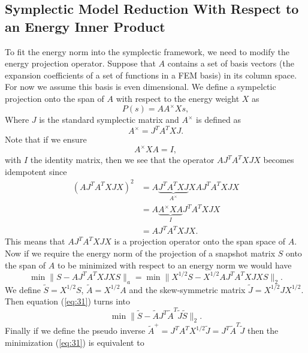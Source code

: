\documentclass[12pt]{article}
\begin{document}
\subsection{Symplectic Model Reduction With Respect to an Energy Inner Product}
To fit the energy norm into the symplectic framework, we need to modify the energy projection operator. Suppose that $A$ contains a set of basis vectors (the expansion coefficients of a set of functions in a FEM basis) in its column space. For now we assume this basis is even dimensional. We define a sympelctic projection onto the span of $A$ with respect to the energy weight $X$ as
\begin{equation} \label{eq:28}
	P(s) = AA^\times Xs,
\end{equation}
Where $J$ is the standard symplectic matrix and $A^\times$ is defined as
\begin{equation} \label{eq:29}
	A^\times = J^T A^T X J.
\end{equation}
Note that if we ensure
\begin{equation} \label{eq:30}
	A^\times XA=I,
\end{equation}
with $I$ the identity matrix, then we see that the operator $AJ^TA^TXJX$ becomes idempotent since
\begin{equation} \label{eq:31}
\begin{aligned}
	(AJ^TA^TXJX)^2 &= A\underbrace{J^TA^TXJ}_{A^\times}XAJ^TA^TXJX \\
	&= A\underbrace{A^\times XA}_{I}J^TA^TXJX\\
       	&= AJ^TA^TXJX.
\end{aligned}
\end{equation}
This means that $AJ^TA^TXJX$ is a projection operator onto the span space of $A$. Now if we require the energy norm of the projection of a snapshot matrix $S$ onto the span of $A$ to be minimized with respect to an energy norm we would have
\begin{equation} \label{eq:32}
	\min \| S - AJ^TA^TXJX S \|_a = \min \| X^{1/2} S - X^{1/2} AJ^TA^TXJX S \|_2.
\end{equation}
We define $\tilde S = X^{1/2}S$, $\tilde A = X^{1/2} A$ and the skew-symmetric matrix $\tilde J = X^{1/2} J X^{1/2}$. Then equation (\ref{eq:31}) turns into
\begin{equation} \label{eq:33}
	\min \| \tilde S - \tilde A J^T {\tilde A}^T \tilde J \tilde S\|_2.
\end{equation}
Finally if we define the pseudo inverse ${\tilde A }^+ = J^T A^T X^{1/2} \tilde J = J^T {\tilde A}^T \tilde J$ then the minimization (\ref{eq:31}) is equivalent to
\end{document}
